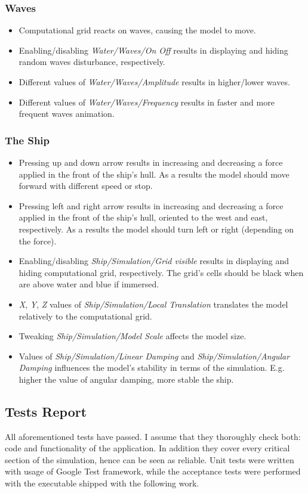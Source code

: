 \documentclass{report}
\begin{document}
\subsubsection{Waves}
\begin{itemize}
\item Computational grid reacts on waves, causing the model to move.
\item Enabling/disabling \textit{Water/Waves/On Off} results in displaying and hiding random waves disturbance, respectively. 
\item Different values of \textit{Water/Waves/Amplitude} results in higher/lower waves.
\item Different values of \textit{Water/Waves/Frequency} results in faster and more frequent waves animation.
\end{itemize}
\subsubsection{The Ship}
\begin{itemize}
\item Pressing up and down arrow results in increasing and decreasing a force applied in the front of the ship's hull. As a results the model should move forward with different speed or stop.
\item Pressing left and right arrow results in increasing and decreasing a force applied in the front of the ship's hull, oriented to the west and east, respectively. As a results the model should turn left or right (depending on the force).
\item Enabling/disabling \textit{Ship/Simulation/Grid visible} results in displaying and hiding computational grid, respectively. The grid's cells should be black when are above water and blue if immersed.
\item \textit{X}, \textit{Y}, \textit{Z} values of \textit{Ship/Simulation/Local Translation} translates the model relatively to the computational grid.
\item Tweaking \textit{Ship/Simulation/Model Scale} affects the model size.
\item Values of \textit{Ship/Simulation/Linear Damping} and \textit{Ship/Simulation/Angular Damping} influences the model's stability in terms of the simulation. E.g. higher the value of angular damping, more stable the ship. 
\end{itemize}

\subsection{Tests Report}
All aforementioned tests have passed. I assume that they thoroughly check both: code and functionality of the application. In addition they cover every critical section of the simulation, hence can be seen as reliable. Unit tests were written with usage of Google Test framework, while the acceptance tests were performed with the executable shipped with the following work.
\end{document}

